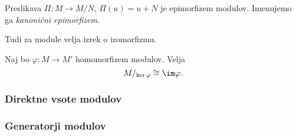 Preslikava $\Pi \colon M \to M/N$, $\Pi(u) = u + N$ je epimorfizem modulov. Imenujemo ga 
\emph{kanonični epimorfizem}.

Tudi za module velja izrek o izomorfizmu. 
\begin{izrek}[o izomorfizmu]
    Naj bo $\varphi \colon M \to M'$ homomorfizem modulov. Velja
    \[
        M/_{\ker\varphi} \cong \im \varphi.
    \]
\end{izrek}

\begin{primer}
    
\end{primer}

\subsubsection*{Direktne vsote modulov}

\begin{definicija}
    
\end{definicija}

\begin{primer}
    
\end{primer}

\begin{definicija}
    
\end{definicija}

\begin{trditev}
    
\end{trditev}

\begin{definicija}
    
\end{definicija}

\begin{primer}
    
\end{primer}


\subsubsection*{Generatorji modulov}

\begin{definicija}
    
\end{definicija}

